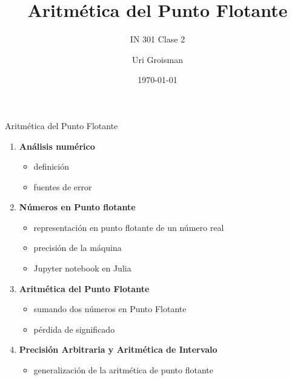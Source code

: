 \documentclass{beamer}
\title{Aritmética del Punto Flotante}
\subtitle{IN 301 Clase 2}
\author{Uri Groisman}
\date{\today}
\begin{document}
\begin{frame}
    \titlepage
\end{frame}

\begin{frame}{Aritmética del Punto Flotante}
    \begin{enumerate}
        \item \textbf{Análisis numérico}
        \begin{itemize}
            \item definición
            \item fuentes de error
        \end{itemize}
        \item \textbf{Números en Punto flotante}
        \begin{itemize}
            \item representación en punto flotante de un número real 
            \item precisión de la máquina
            \item Jupyter notebook en Julia
        \end{itemize}
        \item \textbf{Aritmética del Punto Flotante}
        \begin{itemize}
            \item sumando dos números en Punto Flotante
            \item pérdida de significado
        \end{itemize}
        \item \textbf{Precisión Arbitraria y Aritmética de Intervalo}
        \begin{itemize}
            \item generalización de la aritmética de punto flotante
        \end{itemize}
    \end{enumerate}
\end{frame}
\end{document}
